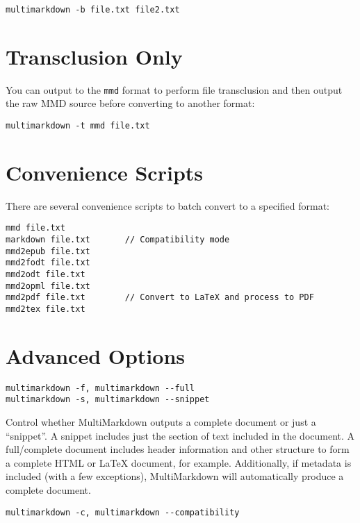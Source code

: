 \begin{verbatim}
multimarkdown -b file.txt file2.txt
\end{verbatim}

\section{Transclusion Only}
\label{transclusiononly}

You can output to the \texttt{mmd} format to perform file transclusion and then output the raw \gls{MMD} source before converting to another format:

\begin{verbatim}
multimarkdown -t mmd file.txt
\end{verbatim}

\section{Convenience Scripts}
\label{conveniencescripts}

There are several convenience scripts to batch convert to a specified format:

\begin{verbatim}
mmd file.txt
markdown file.txt		// Compatibility mode
mmd2epub file.txt
mmd2fodt file.txt
mmd2odt file.txt
mmd2opml file.txt
mmd2pdf file.txt		// Convert to LaTeX and process to PDF
mmd2tex file.txt
\end{verbatim}

\section{Advanced Options}
\label{advancedoptions}

\begin{verbatim}
multimarkdown -f, multimarkdown --full
multimarkdown -s, multimarkdown --snippet
\end{verbatim}

Control whether MultiMarkdown outputs a complete document or just a ``snippet''. A snippet includes just the section of text included in the document. A full\slash{}complete document includes header information and other structure to form a complete HTML or LaTeX document, for example. Additionally, if metadata is included (with a few exceptions), MultiMarkdown will automatically produce a complete document.

\begin{verbatim}
multimarkdown -c, multimarkdown --compatibility
\end{verbatim}

